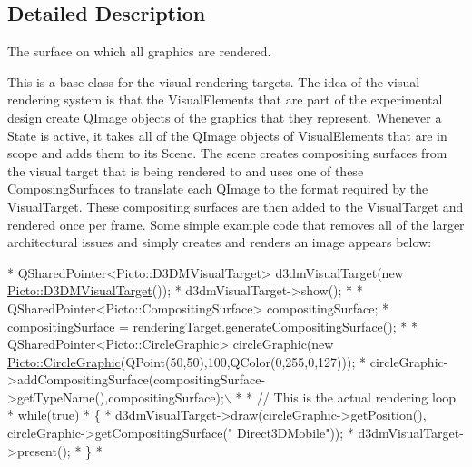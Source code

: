 \subsection{Detailed Description}
The surface on which all graphics are rendered. 

\begin{DoxyVerb}This is a base class for the visual rendering targets.  The idea of the visual rendering system is 
that the VisualElements that are part of the experimental design create QImage objects of the graphics that
they represent.  Whenever a State is active, it takes all of the QImage objects of VisualElements
that are in scope and adds them to its Scene.  The scene creates compositing surfaces from the visual
target that is being rendered to and uses one of these ComposingSurfaces to translate each QImage to
the format required by the VisualTarget.  These compositing surfaces are then added to the VisualTarget
and rendered once per frame.
Some simple example code that removes all of the larger architectural issues and simply creates and 
renders an image appears below:
\end{DoxyVerb}
 
\begin{DoxyCode}
*       QSharedPointer<Picto::D3DMVisualTarget> d3dmVisualTarget(\textcolor{keyword}{new} 
      \hyperlink{struct_picto_1_1_d3_d_m_visual_target}{Picto::D3DMVisualTarget}());
*       d3dmVisualTarget->show();
*
*       QSharedPointer<Picto::CompositingSurface> compositingSurface;
*       compositingSurface = renderingTarget.generateCompositingSurface();
*
*       QSharedPointer<Picto::CircleGraphic> circleGraphic(\textcolor{keyword}{new} 
      \hyperlink{class_picto_1_1_circle_graphic}{Picto::CircleGraphic}(QPoint(50,50),100,QColor(0,255,0,127)));
*       circleGraphic->addCompositingSurface(compositingSurface->getTypeName(),compositingSurface);\(\backslash\)
*
*       \textcolor{comment}{// This is the actual rendering loop}
*       \textcolor{keywordflow}{while}(\textcolor{keyword}{true})
*       \{
*           d3dmVisualTarget->draw(circleGraphic->getPosition(), circleGraphic->getCompositingSurface(\textcolor{stringliteral}{"
      Direct3DMobile"}));
*           d3dmVisualTarget->present();
*       \}
*       
\end{DoxyCode}


